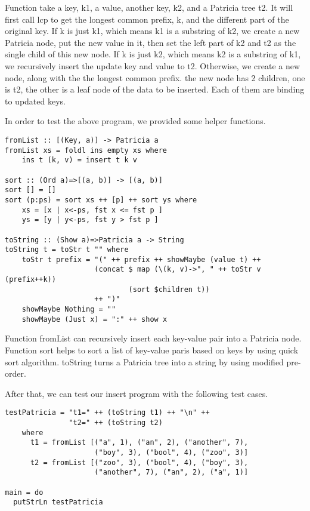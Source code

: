 \documentclass{article}
\begin{document}
Function take a key, k1, a value, another key, k2, and a Patricia tree t2. It will first
call lcp to get the longest common prefix, k, and the different part of the original key.
If k is just k1, which means k1 is a substring of k2, we create a new Patricia node, 
put the new value in it, then set the left part of k2 and t2 as the single child of this 
new node. If k is just k2, which means k2 is a substring of k1, we recursively insert
the update key and value to t2. Otherwise, we create a new node, along with the the longest
common prefix. the new node has 2 children, one is t2, the other is a leaf node of the data
to be inserted. Each of them are binding to updated keys.

In order to test the above program, we provided some helper functions.

\begin{lstlisting}
fromList :: [(Key, a)] -> Patricia a
fromList xs = foldl ins empty xs where
    ins t (k, v) = insert t k v

sort :: (Ord a)=>[(a, b)] -> [(a, b)]
sort [] = []
sort (p:ps) = sort xs ++ [p] ++ sort ys where
    xs = [x | x<-ps, fst x <= fst p ]
    ys = [y | y<-ps, fst y > fst p ]

toString :: (Show a)=>Patricia a -> String
toString t = toStr t "" where
    toStr t prefix = "(" ++ prefix ++ showMaybe (value t) ++
                     (concat $ map (\(k, v)->", " ++ toStr v (prefix++k))
                             (sort $children t))
                     ++ ")"
    showMaybe Nothing = ""
    showMaybe (Just x) = ":" ++ show x
\end{lstlisting}

Function fromList can recursively insert each key-value pair into a Patricia node.
Function sort helps to sort a list of key-value paris based on keys by using quick sort
algorithm. toString turns a Patricia tree into a string by using modified pre-order.

After that, we can test our insert program with the following test cases.

\begin{lstlisting}
testPatricia = "t1=" ++ (toString t1) ++ "\n" ++
               "t2=" ++ (toString t2)
    where
      t1 = fromList [("a", 1), ("an", 2), ("another", 7), 
                     ("boy", 3), ("bool", 4), ("zoo", 3)]
      t2 = fromList [("zoo", 3), ("bool", 4), ("boy", 3), 
                     ("another", 7), ("an", 2), ("a", 1)]

main = do
  putStrLn testPatricia
\end{lstlisting}
\end{document}
